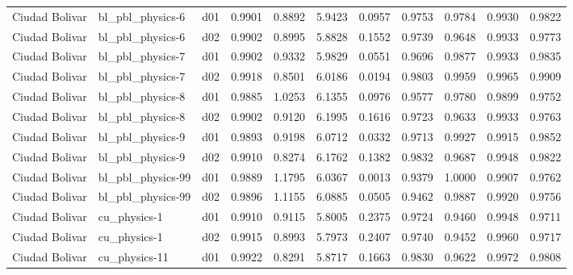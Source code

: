 \begin{longtable}{lllrrrrrrrr}
       Ciudad Bolivar  &      bl\_pbl\_physics-6 &     d01 &   0.9901 &   0.8892 &   5.9423 &       0.0957 &        0.9753 &       0.9784 &           0.9930 &  0.9822 \\
       Ciudad Bolivar  &      bl\_pbl\_physics-6 &     d02 &   0.9902 &   0.8995 &   5.8828 &       0.1552 &        0.9739 &       0.9648 &           0.9933 &  0.9773 \\
       Ciudad Bolivar  &      bl\_pbl\_physics-7 &     d01 &   0.9902 &   0.9332 &   5.9829 &       0.0551 &        0.9696 &       0.9877 &           0.9933 &  0.9835 \\
       Ciudad Bolivar  &      bl\_pbl\_physics-7 &     d02 &   0.9918 &   0.8501 &   6.0186 &       0.0194 &        0.9803 &       0.9959 &           0.9965 &  0.9909 \\
       Ciudad Bolivar  &      bl\_pbl\_physics-8 &     d01 &   0.9885 &   1.0253 &   6.1355 &       0.0976 &        0.9577 &       0.9780 &           0.9899 &  0.9752 \\
       Ciudad Bolivar  &      bl\_pbl\_physics-8 &     d02 &   0.9902 &   0.9120 &   6.1995 &       0.1616 &        0.9723 &       0.9633 &           0.9933 &  0.9763 \\
       Ciudad Bolivar  &      bl\_pbl\_physics-9 &     d01 &   0.9893 &   0.9198 &   6.0712 &       0.0332 &        0.9713 &       0.9927 &           0.9915 &  0.9852 \\
       Ciudad Bolivar  &      bl\_pbl\_physics-9 &     d02 &   0.9910 &   0.8274 &   6.1762 &       0.1382 &        0.9832 &       0.9687 &           0.9948 &  0.9822 \\
       Ciudad Bolivar  &     bl\_pbl\_physics-99 &     d01 &   0.9889 &   1.1795 &   6.0367 &       0.0013 &        0.9379 &       1.0000 &           0.9907 &  0.9762 \\
       Ciudad Bolivar  &     bl\_pbl\_physics-99 &     d02 &   0.9896 &   1.1155 &   6.0885 &       0.0505 &        0.9462 &       0.9887 &           0.9920 &  0.9756 \\
       Ciudad Bolivar  &          cu\_physics-1 &     d01 &   0.9910 &   0.9115 &   5.8005 &       0.2375 &        0.9724 &       0.9460 &           0.9948 &  0.9711 \\
       Ciudad Bolivar  &          cu\_physics-1 &     d02 &   0.9915 &   0.8993 &   5.7973 &       0.2407 &        0.9740 &       0.9452 &           0.9960 &  0.9717 \\
       Ciudad Bolivar  &         cu\_physics-11 &     d01 &   0.9922 &   0.8291 &   5.8717 &       0.1663 &        0.9830 &       0.9622 &           0.9972 &  0.9808 \\

\end{longtable}
